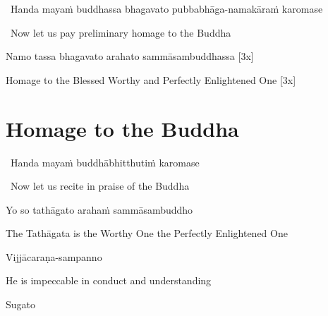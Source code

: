 \begin{leader}
  \anglebracketleft\ \hspace{-0.5mm}Handa mayaṁ buddhassa bhagavato pubbabhāga-namakāraṁ karomase \hspace{-0.5mm}\anglebracketright\
\end{leader}

\begin{leader-english-belowpali}
  \anglebracketleft\ \hspace{-0.5mm}Now let us pay preliminary homage to the Buddha \hspace{-0.5mm}\anglebracketright\
\end{leader-english-belowpali}

Namo tassa bhagavato arahato sammāsambuddhassa \hfill{[3x]}

\begin{english}
  Homage to the Blessed Worthy and Perfectly Enlightened One \hfill{[3x]}
\end{english}

\section{Homage to the Buddha}
\label{homage-buddha}

\begin{leader}
  \anglebracketleft\ \hspace{-0.5mm}Handa mayaṁ buddhābhitthutiṁ karomase \hspace{-0.5mm}\anglebracketright\
\end{leader}
\begin{leader-english-belowpali}
  \anglebracketleft\ \hspace{-0.5mm}Now let us recite in praise of the Buddha \hspace{-0.5mm}\anglebracketright\
\end{leader-english-belowpali}

Yo so tathāgato arahaṁ sammāsambuddho

\begin{english}
  The Tathāgata is the Worthy One the Perfectly Enlightened One
\end{english}

Vijjācaraṇa-sampanno

\begin{english}
  He is impeccable in conduct and understanding
\end{english}

Sugato

